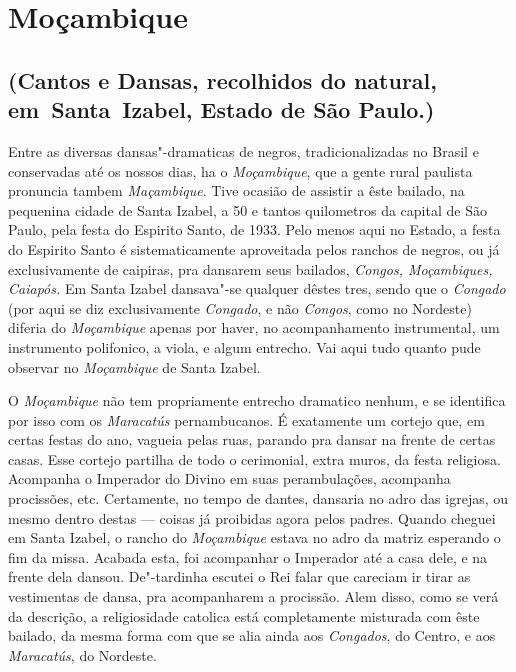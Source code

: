 \chapter*{Moçambique}


\section*{(Cantos e Dansas, recolhidos do natural, em~Santa~Izabel, Estado
de São Paulo.)}

Entre as diversas dansas"-dramaticas de negros, tradicionalizadas no
Brasil e conservadas até os nossos dias, ha o \emph{Moçambique}, que a
gente rural paulista pronuncia tambem \emph{Maçambique}. Tive ocasião de
assistir a êste bailado, na pequenina cidade de Santa Izabel, a 50 e
tantos quilometros da capital de São Paulo, pela festa do Espirito
Santo, de 1933. Pelo menos aqui no Estado, a festa do Espirito Santo é
sistematicamente aproveitada pelos ranchos de negros, ou já
exclusivamente de caipiras, pra dansarem seus bailados, \emph{Congos,
Moçambiques, Caiapós.} Em Santa Izabel dansava"-se qualquer dêstes tres,
sendo que o \emph{Congado} (por aqui se diz exclusivamente
\emph{Congado}, e não \emph{Congos}, como no Nordeste) diferia do
\emph{Moçambique} apenas por haver, no acompanhamento instrumental, um
instrumento polifonico, a viola, e algum entrecho. Vai aqui tudo quanto
pude observar no \emph{Moçambique} de Santa Izabel.

O \emph{Moçambique} não tem propriamente entrecho dramatico nenhum, e se
identifica por isso com os \emph{Maracatús} pernambucanos. É exatamente
um cortejo que, em certas festas do ano, vagueia pelas ruas, parando pra
dansar na frente de certas casas. Esse cortejo partilha de todo o
cerimonial, extra muros, da festa religiosa. Acompanha o Imperador do
Divino em suas perambulações, acompanha procissões, etc. Certamente, no
tempo de dantes, dansaria no adro das igrejas, ou mesmo dentro destas ---
coisas já proibidas agora pelos padres. Quando cheguei em Santa Izabel,
o rancho do \emph{Moçambique} estava no adro da matriz esperando o fim
da missa. Acabada esta, foi acompanhar o Imperador até a casa dele, e na
frente dela dansou. De"-tardinha escutei o Rei falar que careciam ir
tirar as vestimentas de dansa, pra acompanharem a procissão. Alem disso,
como se verá da descrição, a religiosidade catolica está completamente
misturada com êste bailado, da mesma forma com que se alia ainda aos
\emph{Congados}, do Centro, e aos \emph{Maracatús}, do Nordeste.

